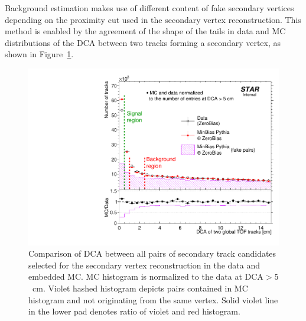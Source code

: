 Background estimation makes use of different content of fake secondary vertices depending on the proximity cut used in the secondary vertex reconstruction. This method is enabled by the agreement of the shape of the tails in data and MC distributions of the DCA between two tracks forming a secondary vertex, as shown in Figure~\ref{fig:DcaOfTwoGlobalTofTrksWithLargeD0_DataVsMC}. %
%
\begin{figure}[t!]\vspace{-2pt}%
\centering%
\begin{minipage}{.4725\textwidth}%
  \centering%
  \includegraphics[width=\linewidth]{graphics/deadMaterial/DcaOfTwoGlobalTofTrksWithLargeD0_DataVsMC.pdf}\vspace{-5pt}%
  \caption[Comparison of DCA between all pairs of secondary track candidates selected for the secondary vertex reconstruction in the data and embedded MC.]%
  {Comparison of DCA between all pairs of secondary track candidates selected for the secondary vertex reconstruction  in the data and embedded MC. MC histogram is normalized to the data at $\text{DCA}>5$~cm. Violet hashed histogram depicts pairs contained in MC histogram and not originating from the same vertex. Solid violet line in the lower pad denotes ratio of violet and red histogram.\newline\newline }\label{fig:DcaOfTwoGlobalTofTrksWithLargeD0_DataVsMC}
\end{minipage}%
\quad\quad%
\begin{minipage}{.4725\textwidth}%
  \centering%

\end{minipage}
\end{figure}
